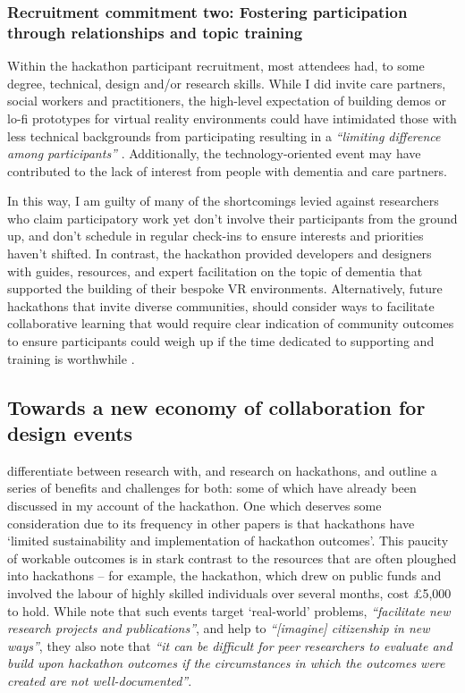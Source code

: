 \subsubsection{Recruitment commitment two: Fostering participation through relationships and topic training}
\label{DiscussionTwo:CommitTwo}
Within the hackathon participant recruitment, most attendees had, to some degree, technical, design and/or research skills. While I did invite care partners, social workers and practitioners, the high-level expectation of building demos or lo-fi prototypes for virtual reality environments could have intimidated those with less technical backgrounds from participating resulting in a \textit{``limiting difference among participants''} \citep{irani_hackathons_2015}. Additionally, the technology-oriented event may have contributed to the lack of interest from people with dementia and care partners. 

In this way, I am guilty of many of the shortcomings levied against researchers who claim participatory work yet don’t involve their participants from the ground up, and don’t schedule in regular check-ins to ensure interests and priorities haven’t shifted. In contrast, the hackathon provided developers and designers with guides, resources, and expert facilitation on the topic of dementia that supported the building of their bespoke VR environments. Alternatively, future hackathons that invite diverse communities, should consider ways to facilitate collaborative learning that would require clear indication of community outcomes to ensure participants could weigh up if the time dedicated to supporting and training is worthwhile \citep{hayes2020inclusive}.

\subsection{Towards a new economy of collaboration for design events}
\label{DiscussionThree}
\cite{falk_olesen_10_2020} differentiate between research with, and research on hackathons, and outline a series of benefits and challenges for both: some of which have already been discussed in my account of the hackathon. One which deserves some consideration due to its frequency in other papers \citep{hope_hackathons_2019,johnson_civic_2014} is that hackathons have ‘limited sustainability and implementation of hackathon outcomes’. This paucity of workable outcomes is in stark contrast to the resources that are often ploughed into hackathons – for example, the hackathon, which drew on public funds and involved the labour of highly skilled individuals over several months, cost £5,000 to hold. While \cite{falk_olesen_10_2020} note that such events target `real-world' problems, \textit{``facilitate new research projects and publications''}, and help to \textit{``[imagine] citizenship in new ways''}, they also note that \textit{``it can be difficult for peer researchers to evaluate and build upon hackathon outcomes if the circumstances in which the outcomes were created are not well-documented''}\citep{falk_olesen_10_2020}.

